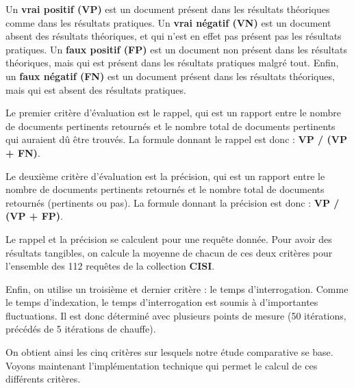 Un \textbf{vrai positif (VP)} est un document présent dans les résultats théoriques comme dans les résultats pratiques. Un \textbf{vrai négatif (VN)} est un document absent des résultats théoriques, et qui n'est en effet pas présent pas les résultats pratiques. Un \textbf{faux positif (FP)} est un document non présent dans les résultats théoriques, mais qui est présent dans les résultats pratiques malgré tout. Enfin, un \textbf{faux négatif (FN)} est un document présent dans les résultats théoriques, mais qui est absent des résultats pratiques.

Le premier critère d'évaluation est le rappel, qui est un rapport entre le nombre de documents pertinents retournés et le nombre total de documents pertinents qui auraient dû être trouvés. La formule donnant le rappel est donc : \textbf{VP / (VP + FN)}. 

Le deuxième critère d'évaluation est la précision, qui est un rapport entre le nombre de documents pertinents retournés et le nombre total de documents retournés (pertinents ou pas). La formule donnant la précision est donc : \textbf{VP / (VP + FP)}.

Le rappel et la précision se calculent pour une requête donnée. Pour avoir des résultats tangibles, on calcule la moyenne de chacun de ces deux critères pour l’ensemble des 112 requêtes de la collection \textbf{CISI}.

Enfin, on utilise un troisième et dernier critère : le temps d’interrogation. Comme le temps d’indexation, le temps d’interrogation est soumis à d’importantes fluctuations. Il est donc déterminé avec plusieurs points de mesure (50 itérations, précédés de 5 itérations de chauffe).

On obtient ainsi les cinq critères sur lesquels notre étude comparative se base. Voyons maintenant l’implémentation technique qui permet le calcul de ces différents critères.